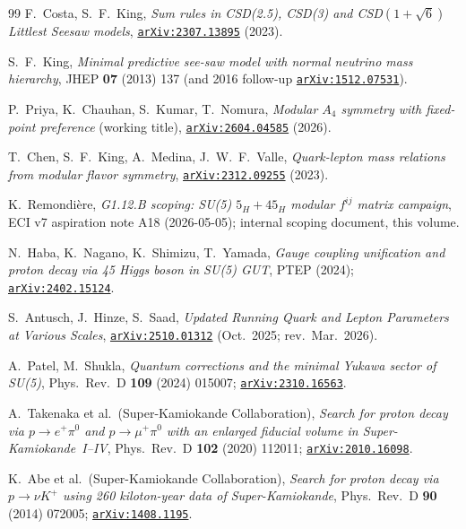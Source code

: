 \documentclass[a4paper,11pt]{article}
\newcommand{\arXiv}[1]{\href{https://arxiv.org/abs/#1}{\texttt{arXiv:#1}}}
\theoremstyle{definition}
\theoremstyle{remark}
\begin{document}
\begin{thebibliography}{99}
F.~Costa, S.~F.~King,
\emph{Sum rules in CSD(2.5), CSD(3) and CSD$(1+\sqrt{6})$ Littlest
Seesaw models},
\arXiv{2307.13895} (2023).

S.~F.~King,
\emph{Minimal predictive see-saw model with normal neutrino mass
hierarchy},
JHEP \textbf{07} (2013) 137 (and 2016 follow-up
\arXiv{1512.07531}).

P.~Priya, K.~Chauhan, S.~Kumar, T.~Nomura,
\emph{Modular $A_4$ symmetry with fixed-point preference}
(working title), \arXiv{2604.04585} (2026).

T.~Chen, S.~F.~King, A.~Medina, J.~W.~F.~Valle,
\emph{Quark-lepton mass relations from modular flavor symmetry},
\arXiv{2312.09255} (2023).

K.~Remondi\`ere,
\emph{G1.12.B scoping: SU(5) $5_H+45_H$ modular $f^{ij}$ matrix
campaign},
ECI v7 aspiration note A18 (2026-05-05);
internal scoping document, this volume.

N.~Haba, K.~Nagano, K.~Shimizu, T.~Yamada,
\emph{Gauge coupling unification and proton decay via 45 Higgs boson
in SU(5) GUT},
PTEP (2024);
\arXiv{2402.15124}.

S.~Antusch, J.~Hinze, S.~Saad,
\emph{Updated Running Quark and Lepton Parameters at Various Scales},
\arXiv{2510.01312} (Oct.~2025; rev.\ Mar.~2026).

A.~Patel, M.~Shukla,
\emph{Quantum corrections and the minimal Yukawa sector of SU(5)},
Phys.~Rev.~D \textbf{109} (2024) 015007;
\arXiv{2310.16563}.

A.~Takenaka et al.\ (Super-Kamiokande Collaboration),
\emph{Search for proton decay via $p\to e^+\pi^0$ and
$p\to\mu^+\pi^0$ with an enlarged fiducial volume in
Super-Kamiokande~I--IV},
Phys.~Rev.~D \textbf{102} (2020) 112011;
\arXiv{2010.16098}.

K.~Abe et al.\ (Super-Kamiokande Collaboration),
\emph{Search for proton decay via $p\to\nu K^+$ using 260 kiloton-year
data of Super-Kamiokande},
Phys.~Rev.~D \textbf{90} (2014) 072005;
\arXiv{1408.1195}.


\end{thebibliography}
\end{document}
